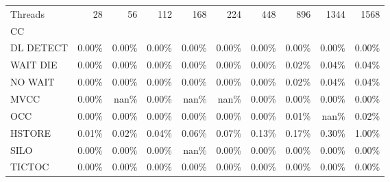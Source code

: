 \begin{tabular}{lrrrrrrrrr}
\toprule
Threads &  28   &  56   &  112  &  168  &  224  &  448  &  896  &  1344 &  1568 \\
CC        &       &       &       &       &       &       &       &       &       \\
\midrule
DL DETECT & 0.00\% & 0.00\% & 0.00\% & 0.00\% & 0.00\% & 0.00\% & 0.00\% & 0.00\% & 0.00\% \\
WAIT DIE  & 0.00\% & 0.00\% & 0.00\% & 0.00\% & 0.00\% & 0.00\% & 0.02\% & 0.04\% & 0.04\% \\
NO WAIT   & 0.00\% & 0.00\% & 0.00\% & 0.00\% & 0.00\% & 0.00\% & 0.02\% & 0.04\% & 0.04\% \\
MVCC      & 0.00\% &  nan\% & 0.00\% &  nan\% &  nan\% & 0.00\% & 0.00\% & 0.00\% & 0.00\% \\
OCC       & 0.00\% & 0.00\% & 0.00\% & 0.00\% & 0.00\% & 0.00\% & 0.01\% &  nan\% & 0.02\% \\
HSTORE    & 0.01\% & 0.02\% & 0.04\% & 0.06\% & 0.07\% & 0.13\% & 0.17\% & 0.30\% & 1.00\% \\
SILO      & 0.00\% & 0.00\% & 0.00\% &  nan\% & 0.00\% & 0.00\% & 0.00\% & 0.00\% & 0.00\% \\
TICTOC    & 0.00\% & 0.00\% & 0.00\% & 0.00\% & 0.00\% & 0.00\% & 0.00\% & 0.00\% & 0.00\% \\
\bottomrule
\end{tabular}
